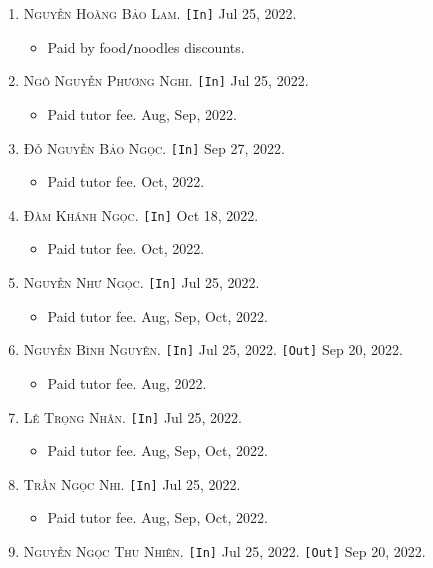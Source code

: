 \documentclass{article}
\numberwithin{equation}{section}
\begin{document}
\begin{enumerate}
	\item \textsc{Nguyễn Hoàng Bảo Lam.} \texttt{[In]} Jul 25, 2022.
	\begin{itemize}
		\item \textsf{Paid by food\texttt{/}noodles discounts.}
	\end{itemize}
	\item \textsc{Ngô Nguyễn Phương Nghi.} \texttt{[In]} Jul 25, 2022.
	\begin{itemize}
		\item \textsf{Paid tutor fee.} Aug, Sep, 2022.
	\end{itemize}
	\item \textsc{Đỗ Nguyễn Bảo Ngọc.} \texttt{[In]} Sep 27, 2022.
	\begin{itemize}
		\item \textsf{Paid tutor fee.} Oct, 2022.
	\end{itemize}
	\item \textsc{Đàm Khánh Ngọc.} \texttt{[In]} Oct 18, 2022.
	\begin{itemize}
		\item \textsf{Paid tutor fee.} Oct, 2022.
	\end{itemize}
	\item \textsc{Nguyễn Như Ngọc.} \texttt{[In]} Jul 25, 2022.
	\begin{itemize}
		\item \textsf{Paid tutor fee.} Aug, Sep, Oct, 2022.
	\end{itemize}
	\item \textsc{Nguyễn Bình Nguyên.} \texttt{[In]} Jul 25, 2022. \texttt{[Out]} Sep 20, 2022.
	\begin{itemize}
		\item \textsf{Paid tutor fee.} Aug, 2022.
	\end{itemize}
	\item \textsc{Lê Trọng Nhân.} \texttt{[In]} Jul 25, 2022.
	\begin{itemize}
		\item \textsf{Paid tutor fee.} Aug, Sep, Oct, 2022.
	\end{itemize}
	\item \textsc{Trần Ngọc Nhi.} \texttt{[In]} Jul 25, 2022.
	\begin{itemize}
		\item \textsf{Paid tutor fee.} Aug, Sep, Oct, 2022.
	\end{itemize}
	\item \textsc{Nguyễn Ngọc Thu Nhiên.} \texttt{[In]} Jul 25, 2022. \texttt{[Out]} Sep 20, 2022.

\end{enumerate}
\end{document}
